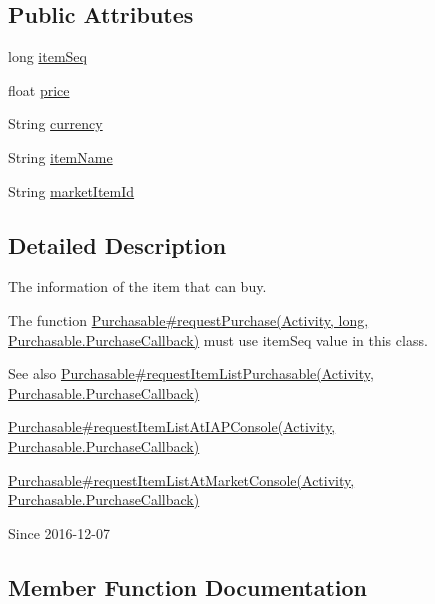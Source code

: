 \subsection*{Public Attributes}
\begin{DoxyCompactItemize}
\item 
long \hyperlink{classcom_1_1toast_1_1android_1_1gamebase_1_1base_1_1purchase_1_1_purchasable_item_ae238e7a4dbb904519cb83075b2ac046f}{item\+Seq}
\item 
float \hyperlink{classcom_1_1toast_1_1android_1_1gamebase_1_1base_1_1purchase_1_1_purchasable_item_a500426aec97889b7572f25ae45c06a8d}{price}
\item 
String \hyperlink{classcom_1_1toast_1_1android_1_1gamebase_1_1base_1_1purchase_1_1_purchasable_item_a21ef1fb8b40391856719451100a37a00}{currency}
\item 
String \hyperlink{classcom_1_1toast_1_1android_1_1gamebase_1_1base_1_1purchase_1_1_purchasable_item_aee3a122fff06051fbf74cc9051fb90c4}{item\+Name}
\item 
String \hyperlink{classcom_1_1toast_1_1android_1_1gamebase_1_1base_1_1purchase_1_1_purchasable_item_a5d29b8e8b35b651ac8ec048046b800c3}{market\+Item\+Id}
\end{DoxyCompactItemize}


\subsection{Detailed Description}
The information of the item that can buy. 

The function \hyperlink{}{Purchasable\#request\+Purchase(\+Activity, long, Purchasable.\+Purchase\+Callback)} must use \textquotesingle{}item\+Seq\textquotesingle{} value in this class.

\begin{DoxySeeAlso}{See also}
\hyperlink{}{Purchasable\#request\+Item\+List\+Purchasable(\+Activity, Purchasable.\+Purchase\+Callback)} 

\hyperlink{}{Purchasable\#request\+Item\+List\+At\+I\+A\+P\+Console(\+Activity, Purchasable.\+Purchase\+Callback)} 

\hyperlink{}{Purchasable\#request\+Item\+List\+At\+Market\+Console(\+Activity, Purchasable.\+Purchase\+Callback)} 
\end{DoxySeeAlso}
\begin{DoxySince}{Since}
2016-\/12-\/07 
\end{DoxySince}


\subsection{Member Function Documentation}
\mbox{\label{classcom_1_1toast_1_1android_1_1gamebase_1_1base_1_1_value_object_ae6655c88c20a9a8406dc11b46250ac7b}} 
